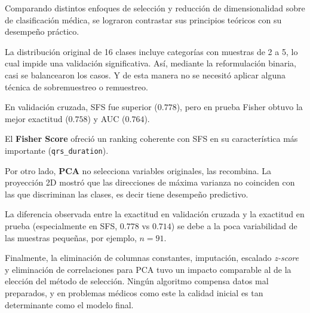 Comparando distintos enfoques de selección y reducción de dimensionalidad sobre
de clasificación médica, se lograron contrastar sus principios teóricos con su
desempeño práctico.

La distribución original de 16 clases incluye categorías con muestras de 2 a 5,
lo cual impide una validación significativa. Así, mediante la reformulación
binaria, casi se balancearon los casos. Y de esta manera no se necesitó aplicar
alguna técnica de sobremuestreo o remuestreo.

En validación cruzada, SFS fue superior ($0.778$), pero en prueba Fisher obtuvo
la mejor exactitud ($0.758$) y AUC ($0.764$).


El \textbf{Fisher Score} ofreció un ranking coherente con SFS
en su característica más importante (\texttt{qrs\_duration}).

Por otro lado, \textbf{PCA} no selecciona variables originales, las recombina.
La proyección 2D mostró que las direcciones de máxima varianza no coinciden con
las que discriminan las clases, es decir tiene desempeño predictivo.

La diferencia observada entre la exactitud en validación cruzada y la
exactitud en prueba (especialmente en SFS, $0.778$ vs $0.714$) se debe a la
poca variabilidad de las muestras pequeñas, por ejemplo, $n = 91$.

Finalmente, la eliminación de columnas constantes, imputación, escalado
\textit{z-score} y eliminación de correlaciones para PCA tuvo un impacto
comparable al de la elección del método de selección. Ningún algoritmo compensa
datos mal preparados, y en problemas médicos como este la calidad inicial es
tan determinante como el modelo final.

\QED